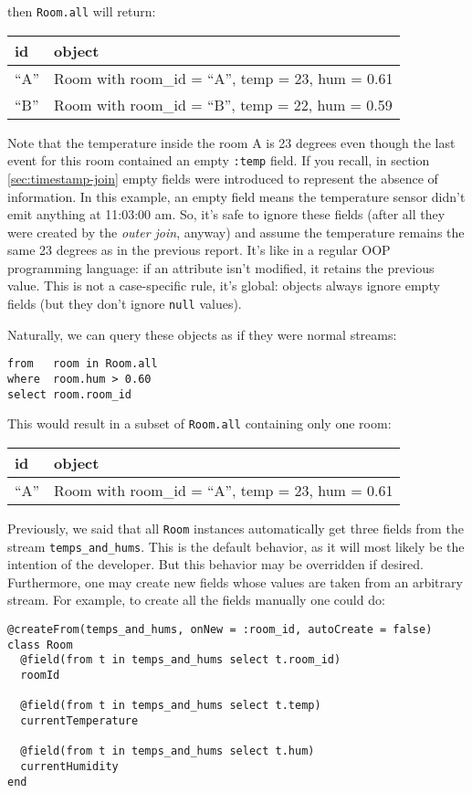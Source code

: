 \documentclass{report}
\begin{document}
then \verb=Room.all= will return:

\begin{tabular}{ |l|l| }
  \hline
  id & object \\
  \hline
  ``A'' & Room with room\_id = ``A'', temp = 23, hum = 0.61 \\
  ``B'' & Room with room\_id = ``B'', temp = 22, hum = 0.59 \\
  \hline
\end{tabular}

Note that the temperature inside the room A is 23 degrees even though
the last event for this room contained an empty \verb=:temp= field. If
you recall, in section \ref{sec:timestamp-join} empty fields were
introduced to represent the absence of information. In this example,
an empty field means the temperature sensor didn't emit anything at
11:03:00 am. So, it's safe to ignore these fields (after all they were
created by the \emph{outer join}, anyway) and assume the temperature
remains the same 23 degrees as in the previous report. It's like in a
regular OOP programming language: if an attribute isn't modified, it
retains the previous value. This is not a case-specific rule, it's
global: objects always ignore empty fields (but they don't ignore
\verb=null= values).

Naturally, we can query these objects as if they were normal streams:

\begin{verbatim}
from   room in Room.all
where  room.hum > 0.60
select room.room_id
\end{verbatim}

This would result in a subset of \verb=Room.all= containing only one
room:

\begin{tabular}{ |l|l| }
  \hline
  id & object \\
  \hline
  ``A'' & Room with room\_id = ``A'', temp = 23, hum = 0.61 \\
  \hline
\end{tabular}

Previously, we said that all \verb=Room= instances automatically get
three fields from the stream \verb=temps_and_hums=. This is the
default behavior, as it will most likely be the intention of the
developer. But this behavior may be overridden if
desired. Furthermore, one may create new fields whose values are taken
from an arbitrary stream. For example, to create all the fields
manually one could do:

\begin{verbatim}
@createFrom(temps_and_hums, onNew = :room_id, autoCreate = false)
class Room
  @field(from t in temps_and_hums select t.room_id)
  roomId

  @field(from t in temps_and_hums select t.temp)
  currentTemperature

  @field(from t in temps_and_hums select t.hum)
  currentHumidity
end
\end{verbatim}
\end{document}
